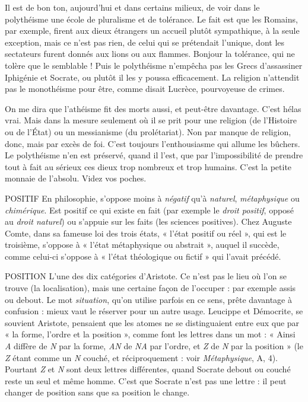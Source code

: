 Il est de bon ton, aujourd’hui et dans certains milieux, de voir dans le polythéisme
une école de pluralisme et de tolérance. Le fait est que les Romains, par
exemple, firent aux dieux étrangers un accueil plutôt sympathique, à la seule
exception, mais ce n’est pas rien, de celui qui se prétendait l'unique, dont les
sectateurs furent donnés aux lions ou aux flammes. Bonjour la tolérance, qui ne
tolère que le semblable ! Puis le polythéisme n’empêcha pas les Grecs d’assassiner
Iphigénie et Socrate, ou plutôt il les y poussa efficacement. La religion
n'attendit pas le monothéisme pour être, comme disait Lucrèce, pourvoyeuse
de crimes.

On me dira que l’athéisme fit des morts aussi, et peut-être davantage. C’est
hélas vrai. Mais dans la mesure seulement où il se prit pour une religion (de
l'Histoire ou de l’État) ou un messianisme (du prolétariat). Non par manque
de religion, donc, mais par excès de foi. C’est toujours l'enthousiasme qui
allume les bûchers. Le polythéisme n’en est préservé, quand il l’est, que par
l'impossibilité de prendre tout à fait au sérieux ces dieux trop nombreux et trop
humains. C’est la petite monnaie de l’absolu. Videz vos poches.

POSITIF En philosophie, s'oppose moins à {\it négatif} qu’à {\it naturel}, {\it métaphysique}
ou {\it chimérique}. Est positif ce qui existe en fait (par exemple le {\it droit
positif}, opposé au {\it droit naturel}) ou s'appuie sur les faits (les sciences positives).
Chez Auguste Comte, dans sa fameuse loi des trois états, « l’état positif ou
réel », qui est le troisième, s'oppose à « l’état métaphysique ou abstrait », auquel
il succède, comme celui-ci s'oppose à « l’état théologique ou fictif » qui l'avait
précédé.

POSITION L'une des dix catégories d’Aristote. Ce n’est pas le lieu où l’on
se trouve (la localisation), mais une certaine façon de l’occuper :
par exemple assis ou debout. Le mot {\it situation}, qu’on utilise parfois en ce sens,
prête davantage à confusion : mieux vaut le réserver pour un autre usage.
Leucippe et Démocrite, se souvient Aristote, pensaient que les atomes ne se
distinguaient entre eux que par « la forme, l’ordre et la position », comme font
les lettres dans un mot : « Ainsi {\it A} diffère de {\it N} par la forme, {\it AN} de {\it NA} par
l’ordre, et {\it Z} de {\it N} par la position » (le {\it Z} étant comme un {\it N} couché, et
réciproquement : voir {\it Métaphysique}, A, 4). Pourtant {\it Z} et {\it N} sont deux lettres
différentes, quand Socrate debout ou couché reste un seul et même homme.
C’est que Socrate n’est pas une lettre : il peut changer de position sans que sa
position le change.

